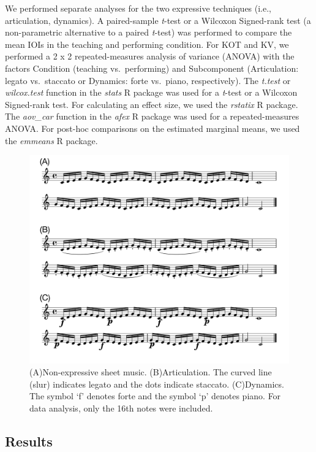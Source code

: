 \documentclass[
  english,
  man,floatsintext]{apa6}
\begin{document}
We performed separate analyses for the two expressive techniques (i.e., articulation, dynamics). A paired-sample \emph{t}-test or a Wilcoxon Signed-rank test (a non-parametric alternative to a paired \emph{t}-test) was performed to compare the mean IOIs in the teaching and performing condition. For KOT and KV, we performed a 2 x 2 repeated-measures analysis of variance (ANOVA) with the factors Condition (teaching vs.~performing) and Subcomponent (Articulation: legato vs.~staccato or Dynamics: forte vs.~piano, respectively). The \emph{t.test} or \emph{wilcox.test} function in the \emph{stats} R package was used for a \emph{t}-test or a Wilcoxon Signed-rank test. For calculating an effect size, we used the \emph{rstatix} R package. The \emph{aov\_car} function in the \emph{afex} R package was used for a repeated-measures ANOVA. For post-hoc comparisons on the estimated marginal means, we used the \emph{emmeans} R package.

\begin{figure}
\includegraphics[width=1\linewidth]{manuscript_files/figure-latex/stim-1-1} \caption{\label{fig:stimuli}(A)Non-expressive sheet music. (B)Articulation. The curved line (slur) indicates legato and the dots indicate staccato. (C)Dynamics. The symbol `f' denotes forte and the symbol `p' denotes piano. For data analysis, only the 16th notes were included.}\label{fig:stim-1}
\end{figure}

\newpage

\hypertarget{results}{%
\subsection{Results}\label{results}}
\end{document}
